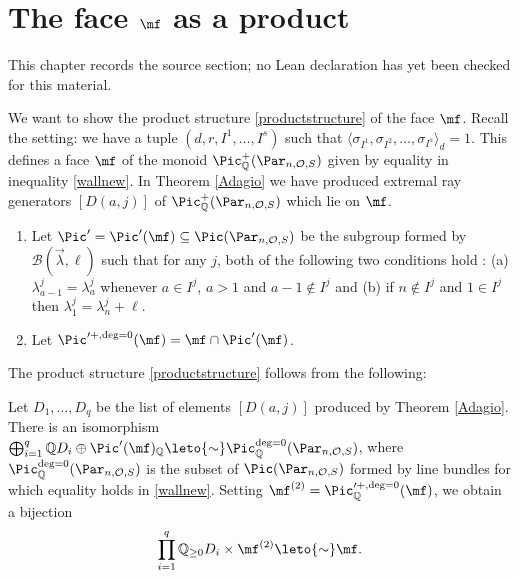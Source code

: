 \chapter{The face $\mf$ as a product}
\label{rigid-local-systems-multiplicative-eigenvalue-problem-chapter-10}

\begin{remark}
\label{rigid-local-systems-multiplicative-eigenvalue-problem-chapter-10-source}
This chapter records the source section; no Lean declaration has yet been checked for this material.
\notready
\end{remark}

We want to show the product structure \eqref{productstructure} of the face $\mf$. Recall the setting:
we have a tuple $(d,r,I^1,\dots,I^s)$ such that
$\langle\sigma_{I^1}, \sigma_{I^2},\dots,\sigma_{I^s}\rangle_{d}=1$. This defines a face $\mf$  of the monoid
$\Pic^+_{\Bbb{Q}}(\Par_{n,\mathcal{O},S})$ given by equality in inequality
\eqref{wallnew}. In Theorem \ref{Adagio} we have produced extremal ray generators $[D(a,j)]$ of $\Pic^+_{\Bbb{Q}}(\Par_{n,\mathcal{O},S})$ which lie on $\mf$.

\begin{defi}
\notready\label{Br2}

\begin{enumerate}
\item Let $\Pic'=\Pic'(\mf)\subseteq\Pic(\Par_{n,\mathcal{O},S})$ be the subgroup formed by  $\mathcal{B}(\vec{\lambda},\ell)$ such that for any $j$, both of the following two conditions hold : (a) $\lambda^j_{a-1}=\lambda^{j}_{a}$ whenever $a\in I^j$, $a>1$ and $a-1\not \in I^j$ and (b) if $n\not\in I^j$ and $1\in I^j$ then $\lambda^j_1=\lambda^{j}_{n}+\ell$.
\item  Let $\Pic'^{+,\deg=0}(\mf)=\mf\cap \Pic'(\mf)$.
\end{enumerate}
\end{defi}

The product structure \eqref{productstructure} follows from the following:
\begin{proposition}
\notready\label{Br4} Let $D_1,\dots, D_q$ be the list of elements $[D(a,j)]$ produced by Theorem \ref{Adagio}. There is an isomorphism
$\bigoplus_{i=1}^{q}\Bbb{Q}D_i \oplus  \Pic' (\mf)_{\Bbb{Q}}\leto{\sim} \Pic^{\deg=0}_{\Bbb{Q}}(\Par_{n,\mathcal{O},S})$, where $\Pic^{\deg=0}_{\Bbb{Q}}(\Par_{n,\mathcal{O},S})$ is the subset of $\Pic(\Par_{n,\mathcal{O},S})$ formed by line bundles for which equality holds in
\eqref{wallnew}.
Setting $\mf^{(2)}= \Pic'^{+,\deg=0}_{\Bbb{Q}}(\mf) $, we obtain a bijection
$$\prod_{i=1}^{q}\Bbb{Q}_{\geq 0}D_i \times  \mf^{(2)} \leto{\sim} \mf.$$
\end{proposition}




